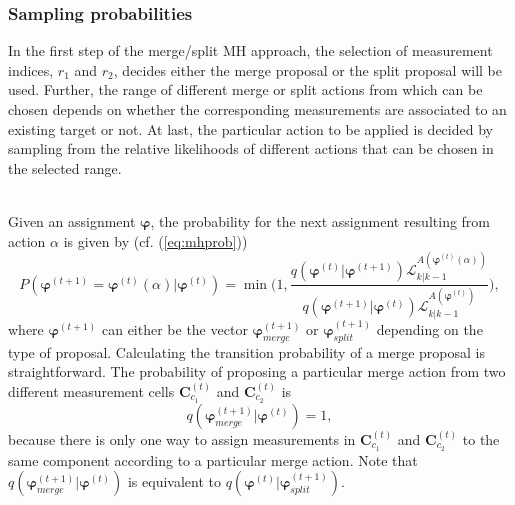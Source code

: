 \subsubsection{Sampling probabilities}
In the first step of the merge/split MH approach, the selection of measurement indices, $r_1$ and $r_2$, decides either the merge proposal or the split proposal will be used. Further, the range of different merge or split actions from which can be chosen depends on whether the corresponding measurements are associated to an existing target or not. At last, the particular action to be applied is decided by sampling from the relative likelihoods of different actions that can be chosen in the selected range. 

~\\
Given an assignment $\boldsymbol{\varphi}$, the probability for the next assignment resulting from action $\alpha$ is given by (cf. (\ref{eq:mhprob}))
\begin{equation}
    P(\boldsymbol{\varphi}^{(t+1)}=\boldsymbol{\varphi}^{(t)}(\alpha)|\boldsymbol{\varphi}^{(t)}) = \min\bigg(1,\frac{q(\boldsymbol{\varphi}^{(t)}|\boldsymbol{\varphi}^{(t+1)})\mathcal{L}^{A(\boldsymbol{\varphi}^{(t)}(\alpha))}_{k|k-1}}{q(\boldsymbol{\varphi}^{(t+1)}|\boldsymbol{\varphi}^{(t)})\mathcal{L}^{A(\boldsymbol{\varphi}^{(t)})}_{k|k-1}}\bigg),
    \label{eq:mhacceptance}
\end{equation}
where $\boldsymbol{\varphi}^{(t+1)}$ can either be the vector $\boldsymbol{\varphi}^{(t+1)}_{merge}$ or $\boldsymbol{\varphi}^{(t+1)}_{split}$ depending on the type of proposal. Calculating the transition probability of a merge proposal is straightforward. The probability of proposing a particular merge action from two different measurement cells $\mathbf{C}_{c_1}^{(t)}$ and $\mathbf{C}_{c_2}^{(t)}$ is
\begin{equation}
    q(\boldsymbol{\varphi}^{(t+1)}_{merge}|\boldsymbol{\varphi}^{(t)}) = 1,
\end{equation}
because there is only one way to assign measurements in $\mathbf{C}_{c_1}^{(t)}$ and $\mathbf{C}_{c_2}^{(t)}$ to the same component according to a particular merge action. Note that $q(\boldsymbol{\varphi}^{(t+1)}_{merge}|\boldsymbol{\varphi}^{(t)})$ is equivalent to $q(\boldsymbol{\varphi}^{(t)}|\boldsymbol{\varphi}^{(t+1)}_{split})$. 

